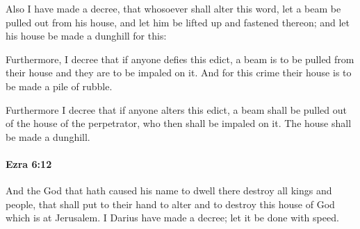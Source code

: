 			\begin{versebox}
					\item[BHS] 
					\item[LXX] 
					\item[ASV] Also I have made a decree, that whosoever shall alter this word, let a beam be pulled out from his house, and let him be lifted up and fastened thereon; and let his house be made a dunghill for this:
					\item[NIV] Furthermore, I decree that if anyone defies this edict, a beam is to be pulled from their house and they are to be impaled on it. And for this crime their house is to be made a pile of rubble.
					\item[NRSV] Furthermore I decree that if anyone alters this edict, a beam shall be pulled out of the house of the perpetrator, who then shall be impaled on it. The house shall be made a dunghill.
			\end{versebox}

		\paragraph{Ezra 6:12} %
			\label{EZRA-6-12}

			And the God that hath caused his name to dwell there destroy all kings and people, that shall put to their hand to alter and to destroy this house of God which is at Jerusalem. I Darius have made a decree; let it be done with speed.

